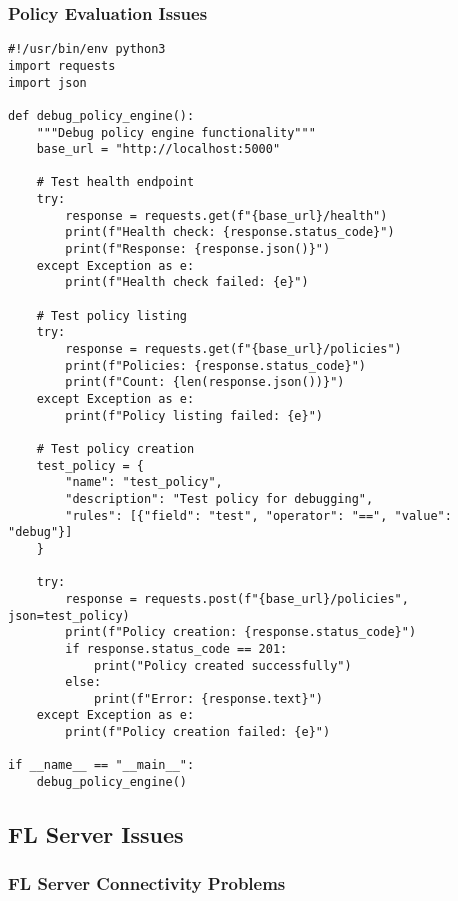 \subsubsection{Policy Evaluation Issues}

\begin{lstlisting}[style=pythoncode, caption=Policy Debugging Script]
#!/usr/bin/env python3
import requests
import json

def debug_policy_engine():
    """Debug policy engine functionality"""
    base_url = "http://localhost:5000"
    
    # Test health endpoint
    try:
        response = requests.get(f"{base_url}/health")
        print(f"Health check: {response.status_code}")
        print(f"Response: {response.json()}")
    except Exception as e:
        print(f"Health check failed: {e}")
    
    # Test policy listing
    try:
        response = requests.get(f"{base_url}/policies")
        print(f"Policies: {response.status_code}")
        print(f"Count: {len(response.json())}")
    except Exception as e:
        print(f"Policy listing failed: {e}")
    
    # Test policy creation
    test_policy = {
        "name": "test_policy",
        "description": "Test policy for debugging",
        "rules": [{"field": "test", "operator": "==", "value": "debug"}]
    }
    
    try:
        response = requests.post(f"{base_url}/policies", json=test_policy)
        print(f"Policy creation: {response.status_code}")
        if response.status_code == 201:
            print("Policy created successfully")
        else:
            print(f"Error: {response.text}")
    except Exception as e:
        print(f"Policy creation failed: {e}")

if __name__ == "__main__":
    debug_policy_engine()
\end{lstlisting}

\subsection{FL Server Issues}

\subsubsection{FL Server Connectivity Problems}

